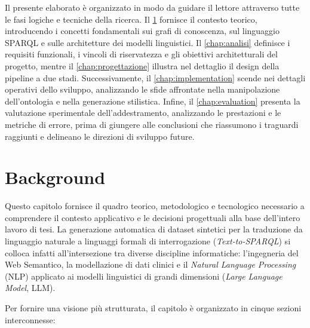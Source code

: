 \documentclass[12pt,a4paper,openright,twoside]{book}
\begin{document}
Il presente elaborato è organizzato in modo da guidare il lettore attraverso
tutte le fasi logiche e tecniche della ricerca. Il \cref{chap:background}
fornisce il contesto teorico, introducendo i concetti fondamentali sui grafi di
conoscenza, sul linguaggio SPARQL e sulle architetture dei modelli linguistici.
Il \cref{chap:analisi} definisce i requisiti funzionali, i vincoli di
riservatezza e gli obiettivi architetturali del progetto, mentre il
\cref{chap:progettazione} illustra nel dettaglio il design della pipeline a due
stadi. Successivamente, il \cref{chap:implementation} scende nei dettagli
operativi dello sviluppo, analizzando le sfide affrontate nella manipolazione
dell'ontologia e nella generazione stilistica. Infine, il
\cref{chap:evaluation} presenta la valutazione sperimentale dell'addestramento,
analizzando le prestazioni e le metriche di errore, prima di giungere alle
conclusioni che riassumono i traguardi raggiunti e delineano le direzioni di
sviluppo future.

\chapter{Background}
\label{chap:background}

Questo capitolo fornisce il quadro teorico, metodologico e tecnologico
necessario a comprendere il contesto applicativo e le decisioni progettuali alla
base dell'intero lavoro di tesi. La generazione automatica di dataset sintetici
per la traduzione da linguaggio naturale a linguaggi formali di interrogazione
(\textit{Text-to-SPARQL}) si colloca infatti all'intersezione tra diverse
discipline informatiche: l'ingegneria del Web Semantico, la modellazione di dati
clinici e il \textit{Natural Language Processing} (NLP) applicato ai modelli
linguistici di grandi dimensioni (\textit{Large Language Model}, LLM).

Per fornire una visione più strutturata, il capitolo è organizzato in cinque
sezioni interconnesse:
\end{document}
